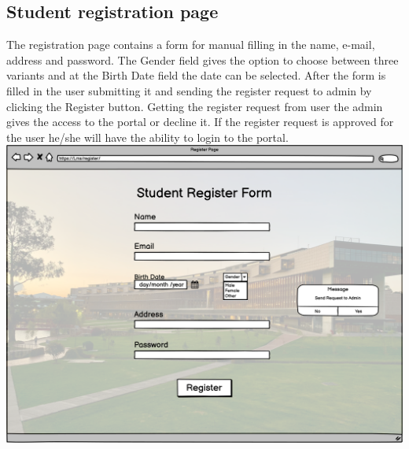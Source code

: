 \newpage
\subsection{Student registration page}
  
The registration page contains a form for manual filling in the name, e-mail, address and password. The Gender field gives the option to choose between three variants and at the Birth Date field the date can be selected. After the form is filled in the user submitting it and sending the register request to admin by clicking the Register button. Getting the register request from user the admin gives the access to the portal or decline it. If the register request is approved for the user he/she will have the ability to login to the portal.\\  

\includegraphics[width=\columnwidth]{images/StudentRegisterForm.png}